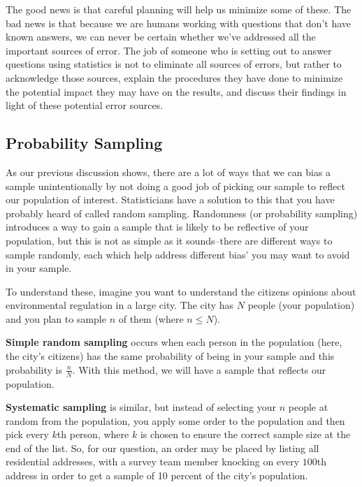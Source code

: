 \documentclass[
]{book}
\theoremstyle{definition}
\theoremstyle{definition}
\theoremstyle{definition}
\theoremstyle{definition}
\theoremstyle{remark}
\begin{document}
The good news is that careful planning will help us minimize some of these. The bad news is that because we are humans working with questions that don't have known answers, we can never be certain whether we've addressed all the important sources of error. The job of someone who is setting out to answer questions using statistics is not to eliminate all sources of errors, but rather to acknowledge those sources, explain the procedures they have done to minimize the potential impact they may have on the results, and discuss their findings in light of these potential error sources.

\hypertarget{probability-sampling}{%
\subsection{Probability Sampling}\label{probability-sampling}}

As our previous discussion shows, there are a lot of ways that we can bias a sample unintentionally by not doing a good job of picking our sample to reflect our population of interest. Statisticians have a solution to this that you have probably heard of called random sampling. Randomness (or probability sampling) introduces a way to gain a sample that is likely to be reflective of your population, but this is not as simple as it sounds--there are different ways to sample randomly, each which help address different bias' you may want to avoid in your sample.

To understand these, imagine you want to understand the citizens opinions about environmental regulation in a large city. The city has \(N\) people (your population) and you plan to sample \(n\) of them (where \(n\leq N\)).

\textbf{Simple random sampling} occurs when each person in the population (here, the city's citizens) has the same probability of being in your sample and this probability is \(\frac{n}{N}\). With this method, we will have a sample that reflects our population.

\textbf{Systematic sampling} is similar, but instead of selecting your \(n\) people at random from the population, you apply some order to the population and then pick every \(k\)th person, where \(k\) is chosen to ensure the correct sample size at the end of the list. So, for our question, an order may be placed by listing all residential addresses, with a survey team member knocking on every \(100\)th address in order to get a sample of 10 percent of the city's population.
\end{document}
